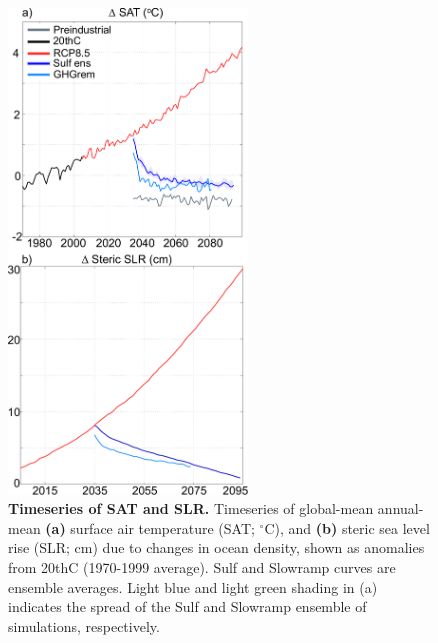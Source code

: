\documentclass[grl]{AGUTeX}  %
\begin{document}
\begin{article}
\begin{figure}[htbp] %
\centering
 \noindent\includegraphics[width=15pc]{figures/SATSLRtimeseries2.pdf}
\caption{\textbf{Timeseries of SAT and SLR.} Timeseries of global-mean annual-mean \textbf{(a)} surface air temperature (SAT; $^\circ$C), and \textbf{(b)} steric sea level rise (SLR; cm) due to changes in ocean density, shown as anomalies from 20thC (1970-1999 average). Sulf and Slowramp curves are ensemble averages. Light blue and light green shading in (a) indicates the spread of the Sulf and Slowramp ensemble of simulations, respectively.}
\label{fig:gmts} %
\end{figure}



\end{article}
\end{document}
